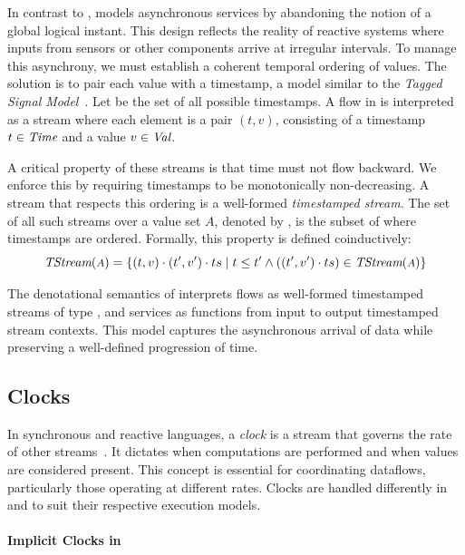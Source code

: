 In contrast to \GRSync, \GRFRP models asynchronous services by abandoning the notion of a global
logical instant. This design reflects the reality of reactive systems where inputs from sensors or
other components arrive at irregular intervals. To manage this asynchrony, we must establish a
coherent temporal ordering of values.
%
The solution is to pair each value with a timestamp, a model similar to the
\emph{Tagged Signal Model}~\cite{DBLP:journals/tcad/LeeS98}. Let \Time be the set of all possible
timestamps. A flow in \GRFRP is interpreted as a stream where each element is a pair $(t, v)$,
consisting of a timestamp $t \in \textit{Time}$ and a value $v \in \textit{Val}$.

A critical property of these streams is that time must not flow backward. We enforce this by
requiring timestamps to be monotonically non-decreasing. A stream that respects this ordering is a
well-formed \emph{timestamped stream}. The set of all such streams over a value set $A$, denoted by
, is the subset of  where timestamps are ordered.
%
Formally, this property is defined coinductively:
%
\begin{equation}
    \textit{TStream}(\mbox{\footnotesize\ensuremath{A}}) = \{ (t, v) \cdot (t', v') \cdot ts \mid t \le t' \wedge
    ((t', v') \cdot ts) \in \textit{TStream}(\mbox{\footnotesize\ensuremath{A}})\}
    \label{eq:semantics:streams:usage:tstream}
\end{equation}

The denotational semantics of \GRFRP interprets flows as well-formed timestamped streams of type
\TStream{\Val}, and services as functions from input to output timestamped stream contexts. This
model captures the asynchronous arrival of data while preserving a well-defined progression of time.

\subsection{Clocks}
\label{sec:semantics:streams:clock}

In synchronous and reactive languages, a \emph{clock} is a stream that governs the rate of other
streams~\cite{DBLP:conf/emsoft/ColacoP03}. It dictates when computations are performed and when
values are considered present. This concept is essential for coordinating dataflows, particularly
those operating at different rates. Clocks are handled differently in \GRSync and \GRFRP to suit
their respective execution models.

\paragraph{Implicit Clocks in \GRSync}

